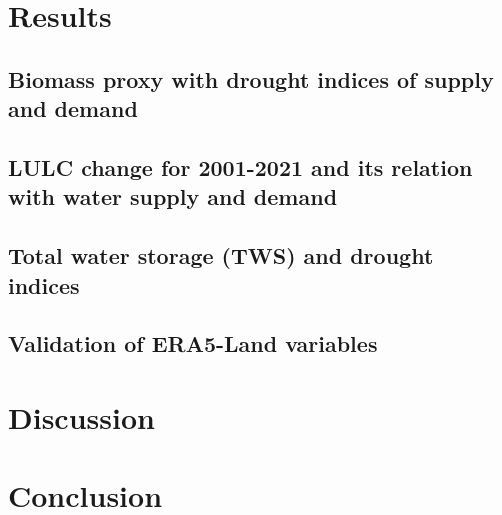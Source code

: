 \documentclass[
  number,
  preprint,
  3p]{elsarticle}
\begin{document}
\hypertarget{results}{%
\section{Results}\label{results}}

\hypertarget{biomass-proxy-with-drought-indices-of-supply-and-demand}{%
\subsection{Biomass proxy with drought indices of supply and
demand}\label{biomass-proxy-with-drought-indices-of-supply-and-demand}}

\hypertarget{lulc-change-for-2001-2021-and-its-relation-with-water-supply-and-demand-1}{%
\subsection{LULC change for 2001-2021 and its relation with water supply
and
demand}\label{lulc-change-for-2001-2021-and-its-relation-with-water-supply-and-demand-1}}

\hypertarget{total-water-storage-tws-and-drought-indices}{%
\subsection{Total water storage (TWS) and drought
indices}\label{total-water-storage-tws-and-drought-indices}}

\hypertarget{validation-of-era5-land-variables-1}{%
\subsection{Validation of ERA5-Land
variables}\label{validation-of-era5-land-variables-1}}

\hypertarget{discussion}{%
\section{Discussion}\label{discussion}}

\hypertarget{conclusion}{%
\section{Conclusion}\label{conclusion}}


\renewcommand\refname{References}
  
\end{document}

